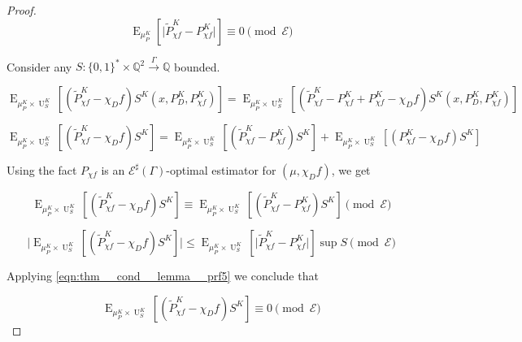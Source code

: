 \documentclass{article}
\numberwithin{equation}{section}
\theoremstyle{definition}
\theoremstyle{plain}
\newcommand{\Bool}{\{0,1\}}
\newcommand{\Words}{{\Bool^*}}
\DeclareMathOperator{\E}{E}
\DeclareMathOperator{\Un}{U}
\newcommand{\Rats}{\mathbb{Q}}
\newcommand{\Abs}[1]{\lvert #1 \rvert}
\newcommand{\Fall}{\mathcal{E}}
\newcommand{\ESG}{\Fall^\sharp(\Gamma)}
\newcommand{\Scheme}{\xrightarrow{\Gamma}}
\begin{document}
\begin{proof}
\begin{equation}
\label{eqn:thm__cond__lemma__prf5}
\E_{\mu_P^K}[\Abs{\tilde{P}_{\chi f}^K - P_{\chi f}^K}] \equiv 0 \pmod \Fall
\end{equation}

Consider any $S: \Words \times \Rats^2 \Scheme \Rats$ bounded.

\[\E_{\mu_P^K \times \Un_S^K}[(\tilde{P}_{\chi f}^K - \chi_Df) S^K(x,P_D^K,P_{\chi f}^K)]=\E_{\mu_P^K \times \Un_S^K}[(\tilde{P}_{\chi f}^K - P_{\chi f}^K + P_{\chi f}^K - \chi_Df) S^K(x,P_D^K,P_{\chi f}^K)]\]

\[\E_{\mu_P^K \times \Un_S^K}[(\tilde{P}_{\chi f}^K - \chi_D f) S^K]=\E_{\mu_P^K \times \Un_S^K}[(\tilde{P}_{\chi f}^K - P_{\chi f}^K) S^K]+\E_{\mu_P^K \times \Un_S^K}[( P_{\chi f}^K - \chi_Df) S^K]\]

Using the fact $P_{\chi f}$ is an $\ESG$-optimal estimator for $(\mu, \chi_D f)$, we get

\[\E_{\mu_P^K \times \Un_S^K}[(\tilde{P}_{\chi f}^K - \chi_D f) S^K] \equiv \E_{\mu_P^K \times \Un_S^K}[(\tilde{P}_{\chi f}^K - P_{\chi f}^K) S^K] \pmod \Fall\]

\[\Abs{\E_{\mu_P^K \times \Un_S^K}[(\tilde{P}_{\chi f}^K - \chi_D f) S^K]} \leq \E_{\mu_P^K \times \Un_S^K}[\Abs{\tilde{P}_{\chi f}^K - P_{\chi f}^K}] \sup S \pmod \Fall\]

Applying \ref{eqn:thm__cond__lemma__prf5} we conclude that

\[\E_{\mu_P^K \times \Un_S^K}[(\tilde{P}_{\chi f}^K - \chi_D f) S^K] \equiv 0 \pmod \Fall\]
%
\end{proof}
\end{document}
